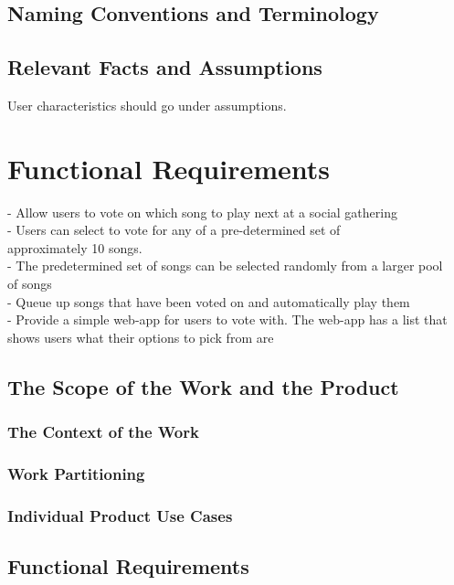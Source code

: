 \documentclass[12pt, titlepage]{article}
\begin{document}
\subsection{Naming Conventions and Terminology}

\subsection{Relevant Facts and Assumptions}

User characteristics should go under assumptions.

\section{Functional Requirements}

- Allow users to vote on which song to play next at a social gathering \\
- Users can select to vote for any of a pre-determined set of \\
  approximately 10 songs. \\
- The predetermined set of songs can be selected randomly from a larger pool \\
  of songs \\
- Queue up songs that have been voted on and automatically play them \\
- Provide a simple web-app for users to vote with. The web-app has a list that
  shows users what their options to pick from are \\

\subsection{The Scope of the Work and the Product}

\subsubsection{The Context of the Work}

\subsubsection{Work Partitioning}

\subsubsection{Individual Product Use Cases}

\subsection{Functional Requirements}
\end{document}
